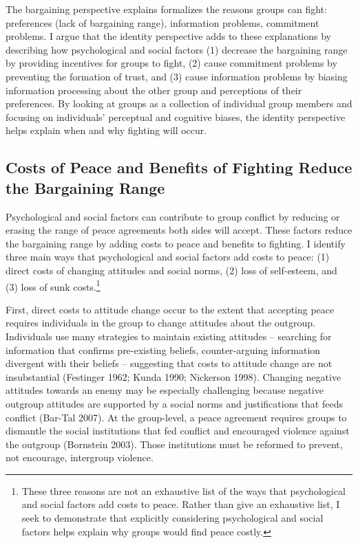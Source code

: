 \documentclass[11pt]{article}
\begin{document}
The bargaining perspective explains formalizes the reasons groups can
fight: preferences (lack of bargaining range), information problems,
commitment problems. I argue that the identity perspective adds to these
explanations by describing how psychological and social factors (1)
decrease the bargaining range by providing incentives for groups to
fight, (2) cause commitment problems by preventing the formation of
trust, and (3) cause information problems by biasing information
processing about the other group and perceptions of their preferences.
By looking at groups as a collection of individual group members and
focusing on individuals' perceptual and cognitive biases, the identity
perspective helps explain when and why fighting will occur.

\hypertarget{costs-of-peace-and-benefits-of-fighting-reduce-the-bargaining-range}{%
\subsection{Costs of Peace and Benefits of Fighting Reduce the
Bargaining
Range}\label{costs-of-peace-and-benefits-of-fighting-reduce-the-bargaining-range}}

Psychological and social factors can contribute to group conflict by
reducing or erasing the range of peace agreements both sides will
accept. These factors reduce the bargaining range by adding costs to
peace and benefits to fighting. I identify three main ways that
psychological and social factors add costs to peace: (1) direct costs of
changing attitudes and social norms, (2) loss of self-esteem, and (3)
loss of sunk costs.\footnote{These three reasons are not an exhaustive
  list of the ways that psychological and social factors add costs to
  peace. Rather than give an exhaustive list, I seek to demonstrate that
  explicitly considering psychological and social factors helps explain
  why groups would find peace costly.}

First, direct costs to attitude change occur to the extent that
accepting peace requires individuals in the group to change attitudes
about the outgroup. Individuals use many strategies to maintain existing
attitudes -- searching for information that confirms pre-existing
beliefs, counter-arguing information divergent with their beliefs --
suggesting that costs to attitude change are not insubstantial
(Festinger 1962; Kunda 1990; Nickerson 1998). Changing negative
attitudes towards an enemy may be especially challenging because
negative outgroup attitudes are supported by a social norms and
justifications that feeds conflict (Bar-Tal 2007). At the group-level, a
peace agreement requires groups to dismantle the social institutions
that fed conflict and encouraged violence against the outgroup
(Bornstein 2003). Those institutions must be reformed to prevent, not
encourage, intergroup violence.
\end{document}
